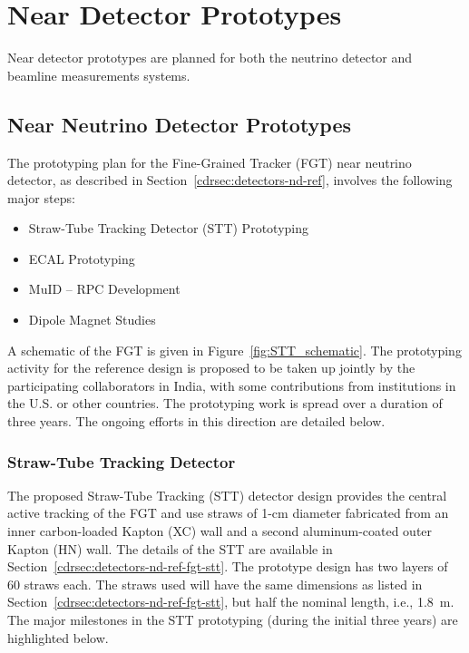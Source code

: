 
\section{Near Detector Prototypes}
\label{sec:proto-nd}
Near detector prototypes are planned for both the neutrino detector and beamline measurements systems.

\subsection{Near Neutrino Detector Prototypes}
\label{sec:proto-nd-nnd}
The prototyping plan for the Fine-Grained Tracker (FGT) near neutrino
detector, as described in Section~\ref{cdrsec:detectors-nd-ref},
involves the following major steps:
\begin{itemize}
\item Straw-Tube Tracking Detector (STT) Prototyping
\item ECAL Prototyping
\item MuID -- RPC Development
\item Dipole Magnet Studies
\end{itemize}

A schematic of the FGT is given in
Figure~\ref{fig:STT_schematic}. The prototyping activity for the
reference design %
is proposed to be taken up jointly by
the participating collaborators in India, with some contributions from institutions in
the U.S. or other countries. %
The prototyping work is spread
over a duration of three years. The %
ongoing efforts in this
direction are detailed below.

\subsubsection{Straw-Tube Tracking Detector}

The proposed Straw-Tube Tracking (STT) detector design
provides the central active tracking of the FGT and use straws of
1-cm diameter fabricated from an inner carbon-loaded Kapton (XC) wall
and a second aluminum-coated outer Kapton (HN) wall. The details of the
STT are available in
Section~\ref{cdrsec:detectors-nd-ref-fgt-stt}. The prototype design
has two layers of 60 straws each.  The straws used will have the
same dimensions as listed in
Section~\ref{cdrsec:detectors-nd-ref-fgt-stt}, but half the nominal
length, i.e., 1.8~m. The major milestones in the STT prototyping
(during the initial three years) are highlighted below.

